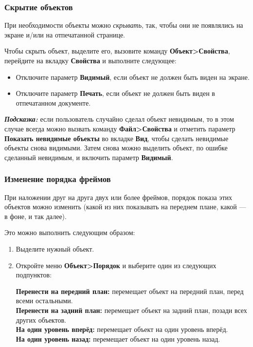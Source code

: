 \documentclass[a4paper,10pt]{article}
\begin{document}
\subsubsection{Скрытие объектов}
При необходимости объекты можно \textit{скрывать}, так, чтобы они не появлялись на экране и/или на отпечатанной странице.

Чтобы скрыть объект, выделите его, вызовите команду \textbf{Объект>Свойства}, перейдите на вкладку \textbf{Свойства} и выполните следующее:
\begin{itemize}
 \item Отключите параметр \textbf{Видимый}, если объект не должен быть виден на экране.
 \item Отключите параметр \textbf{Печать}, если объект не должен быть виден в отпечатанном документе.
\end{itemize}

\textit{\textbf{Подсказка:}} если пользователь случайно сделал объект невидимым, то в этом случае всегда можно вызвать команду \textbf{Файл>Свойства} и отметить параметр \textbf{Показать невидимые объекты} во вкладке \textbf{Вид}, чтобы сделать невидимые объекты снова видимыми. Затем снова можно выделить объект, по ошибке сделанный невидимым, и включить параметр \textbf{Видимый}.

\subsubsection{Изменение порядка фреймов}
При наложении друг на друга двух или более фреймов, порядок показа этих объектов можно изменить (какой из них показывать на переднем плане, какой --- в фоне, и так далее).

Это можно выполнить следующим образом:

\begin{enumerate}
 \item Выделите нужный объект.
 \item Откройте меню \textbf{Объект>Порядок} и выберите один из следующих подпунктов:
 
 \textbf{Перенести на передний план:} перемещает объект на передний план, перед всеми остальными.\\
 \textbf{Перенести на задний план:} перемещает объект на задний план, позади всех других объектов.\\
 \textbf{На один уровень вперёд:} перемещает объект на один уровень вперёд.\\
 \textbf{На один уровень назад:} перемещает объект на один уровень назад.\\
\end{enumerate}
\end{document}
